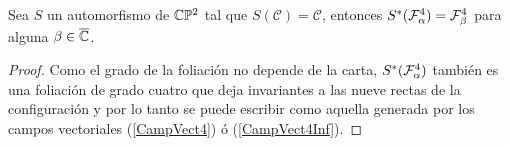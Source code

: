 \begin{Lema}
\label{Lema:Jalando}
Sea $S$ un automorfismo de $\CP$ tal que $S(\mathcal{C})=\mathcal{C}$, entonces $S^{*}(\Fol[4]{\alpha})=\Fol[4]{\beta}$ para alguna $\beta\in\overline\C$.
\end{Lema}

\begin{proof}
Como el grado de la foliación no depende de la carta, $S^{*}(\Fol[4]{\alpha})$ también es una foliación de grado cuatro que deja invariantes a las nueve rectas de la configuración y por lo tanto se puede escribir como aquella generada por los campos vectoriales (\ref{CampVect4}) ó (\ref{CampVect4Inf}).
\end{proof}








